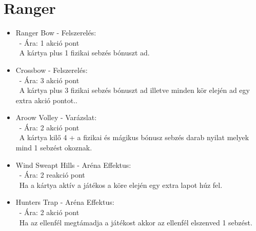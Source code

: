 \section{Ranger}
\begin{itemize}
    \item Ranger Bow - Felszerelés:\\\
    - Ára: 1 akció pont \\\
    A kártya plus 1 fizikai sebzés bónuszt ad.
    \item Crossbow - Felszerelés:\\\
    - Ára: 3 akció pont \\\
    A kártya plus 3 fizikai sebzés bónuszt ad illetve minden kör elején ad egy extra akció pontot..
    \item Aroow Volley - Varázslat:\\\
    - Ára: 2 akció pont \\\
    A kártya kilő 4 + a fizikai és mágikus bónusz sebzés darab nyilat melyek mind 1 sebzést okoznak. 
    \item Wind Sweapt Hills - Aréna Effektus:\\\
    - Ára: 2 reakció pont \\\
    Ha a kártya aktív a játékos a köre elején egy extra lapot húz fel.
    \item Hunters Trap - Aréna Effektus:\\\
    - Ára: 2 akció pont \\\
    Ha az ellenfél megtámadja a játékost akkor az ellenfél elszenved 1 sebzést.
\end{itemize}

